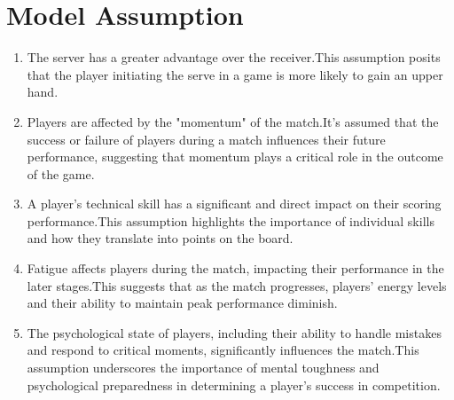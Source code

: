 \documentclass{article}
\begin{document}
\section{Model Assumption}
\begin{enumerate}
\item The server has a greater advantage over the receiver.This assumption posits that the player initiating the serve in a game is more likely to gain an upper hand.
\item Players are affected by the "momentum" of the match.It's assumed that the success or failure of players during a match influences their future performance, suggesting that momentum plays a critical role in the outcome of the game.
\item A player's technical skill has a significant and direct impact on their scoring performance.This assumption highlights the importance of individual skills and how they translate into points on the board.
\item Fatigue affects players during the match, impacting their performance in the later stages.This suggests that as the match progresses, players' energy levels and their ability to maintain peak performance diminish.
\item The psychological state of players, including their ability to handle mistakes and respond to critical moments, significantly influences the match.This assumption underscores the importance of mental toughness and psychological preparedness in determining a player's success in competition.
\end{enumerate}
\end{document}
